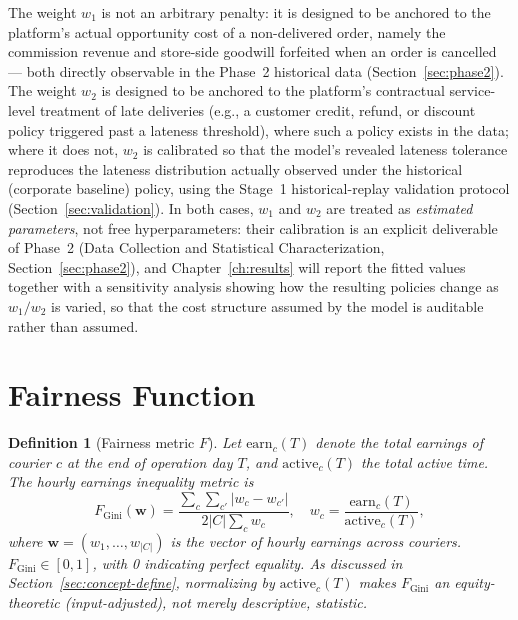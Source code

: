 \documentclass[12pt,a4paper]{report}
\newtheorem{definition}{Definition}
\begin{document}
The weight $w_1$ is not an arbitrary penalty: it is designed to be anchored to the platform's actual opportunity cost of a non-delivered order, namely the commission revenue and store-side goodwill forfeited when an order is cancelled --- both directly observable in the Phase~2 historical data (Section~\ref{sec:phase2}). The weight $w_2$ is designed to be anchored to the platform's contractual service-level treatment of late deliveries (e.g., a customer credit, refund, or discount policy triggered past a lateness threshold), where such a policy exists in the data; where it does not, $w_2$ is calibrated so that the model's revealed lateness tolerance reproduces the lateness distribution actually observed under the historical (corporate baseline) policy, using the Stage~1 historical-replay validation protocol (Section~\ref{sec:validation}). In both cases, $w_1$ and $w_2$ are treated as \emph{estimated parameters}, not free hyperparameters: their calibration is an explicit deliverable of Phase~2 (Data Collection and Statistical Characterization, Section~\ref{sec:phase2}), and Chapter~\ref{ch:results} will report the fitted values together with a sensitivity analysis showing how the resulting policies change as $w_1/w_2$ is varied, so that the cost structure assumed by the model is auditable rather than assumed.

\section{Fairness Function}
\label{sec:fairness}

\begin{definition}[Fairness metric $F$]
    Let $\text{earn}_c(T)$ denote the total earnings of courier $c$ at the end of operation day $T$, and $\text{active}_c(T)$ the total active time. The \emph{hourly earnings inequality} metric is
    \begin{equation}
        F_{\text{Gini}}(\mathbf{w}) = \frac{\sum_{c} \sum_{c'} |w_c - w_{c'}|}
        {2|C|\sum_{c} w_c},
        \quad w_c = \frac{\text{earn}_c(T)}{\text{active}_c(T)},
        \label{eq:gini}
    \end{equation}
    where $\mathbf{w} = (w_1, \ldots, w_{|C|})$ is the vector of hourly earnings across couriers. $F_{\text{Gini}} \in [0,1]$, with 0 indicating perfect equality. As discussed in Section~\ref{sec:concept-define}, normalizing by $\text{active}_c(T)$ makes $F_{\text{Gini}}$ an equity-theoretic (input-adjusted), not merely descriptive, statistic.
\end{definition}
\end{document}
